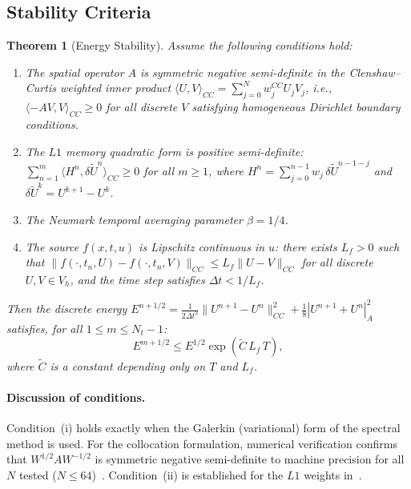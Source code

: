 \documentclass[a4paper,fleqn]{cas-sc}
\newtheorem{theorem}{Theorem}
\begin{document}
\subsection{Stability Criteria}

\begin{theorem}[Energy Stability]\label{thm:stability}
Assume the following conditions hold:
\begin{enumerate}
    \item[(i)] The spatial operator $A$ is symmetric negative semi-definite in the Clenshaw--Curtis weighted inner product $\langle U, V \rangle_{CC} = \sum_{j=0}^N w_j^{CC} U_j V_j$, i.e., $\langle -A V, V \rangle_{CC} \ge 0$ for all discrete $V$ satisfying homogeneous Dirichlet boundary conditions.
    \item[(ii)] The $L1$ memory quadratic form is positive semi-definite: $\sum_{n=1}^{m}\langle H^n, \delta\tilde{U}^n\rangle_{CC} \ge 0$ for all $m \ge 1$, where $H^n = \sum_{j=0}^{n-1} w_j\,\delta\tilde{U}^{n-1-j}$ and $\delta\tilde{U}^k = U^{k+1}-U^k$.


    \item[(iii)] The Newmark temporal averaging parameter $\beta = 1/4$.
    \item[(iv)] The source $f(x,t,u)$ is Lipschitz continuous in $u$: there exists $L_f > 0$ such that $\|f(\cdot,t_n,U) - f(\cdot,t_n,V)\|_{CC} \le L_f \|U - V\|_{CC}$ for all discrete $U, V \in V_h$, and the time step satisfies $\Delta t < 1/L_f$.
\end{enumerate}
Then the discrete energy $E^{n+1/2} = \frac{1}{2\Delta t^2}\|U^{n+1}-U^n\|_{CC}^2 + \frac{1}{8}|U^{n+1}+U^n|_A^2$ satisfies, for all $1 \le m \le N_t-1$:
\begin{equation}\label{eq:stability_result}
    E^{m+1/2} \le E^{1/2} \exp(\widetilde{C} \, L_f \, T),
\end{equation}
where $\widetilde{C}$ is a constant depending only on $T$ and $L_f$.
\end{theorem}

\paragraph{Discussion of conditions.} Condition~(i) holds exactly when the Galerkin (variational) form of the spectral method is used. For the collocation formulation, numerical verification confirms that $W^{1/2}AW^{-1/2}$ is symmetric negative semi-definite to machine precision for all $N$ tested ($N \le 64$)~\cite{gottlieb1977}. Condition~(ii) is established for the $L1$ weights in~\cite{ref21,liao2018sharp}.
\end{document}
